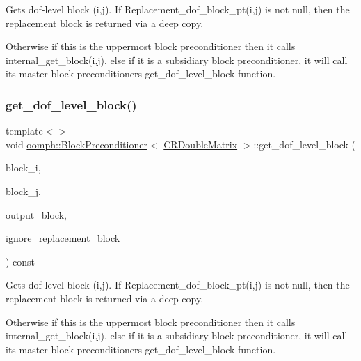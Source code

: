 Gets dof-\/level block (i,j). If Replacement\+\_\+dof\+\_\+block\+\_\+pt(i,j) is not null, then the replacement block is returned via a deep copy. 

Otherwise if this is the uppermost block preconditioner then it calls internal\+\_\+get\+\_\+block(i,j), else if it is a subsidiary block preconditioner, it will call it\textquotesingle{}s master block preconditioners\textquotesingle{} get\+\_\+dof\+\_\+level\+\_\+block function. \mbox{\label{classoomph_1_1BlockPreconditioner_a27943f064e188f326f378ea02522c267}} 
\subsubsection{\texorpdfstring{get\+\_\+dof\+\_\+level\+\_\+block()}{get\_dof\_level\_block()}\hspace{0.1cm}{\footnotesize\ttfamily [2/2]}}
{\footnotesize\ttfamily template$<$$>$ \\
void \hyperlink{classoomph_1_1BlockPreconditioner}{oomph\+::\+Block\+Preconditioner}$<$ \hyperlink{classoomph_1_1CRDoubleMatrix}{C\+R\+Double\+Matrix} $>$\+::get\+\_\+dof\+\_\+level\+\_\+block (\begin{DoxyParamCaption}\item[{const unsigned \&}]{block\+\_\+i,  }\item[{const unsigned \&}]{block\+\_\+j,  }\item[{\hyperlink{classoomph_1_1CRDoubleMatrix}{C\+R\+Double\+Matrix} \&}]{output\+\_\+block,  }\item[{const bool \&}]{ignore\+\_\+replacement\+\_\+block }\end{DoxyParamCaption}) const}



Gets dof-\/level block (i,j). If Replacement\+\_\+dof\+\_\+block\+\_\+pt(i,j) is not null, then the replacement block is returned via a deep copy. 

Otherwise if this is the uppermost block preconditioner then it calls internal\+\_\+get\+\_\+block(i,j), else if it is a subsidiary block preconditioner, it will call it\textquotesingle{}s master block preconditioners\textquotesingle{} get\+\_\+dof\+\_\+level\+\_\+block function. 

